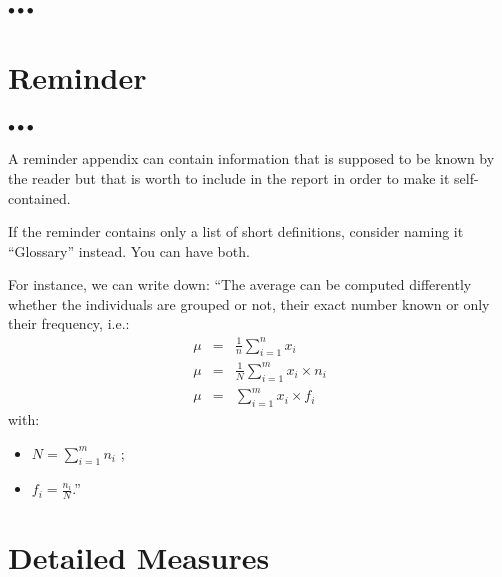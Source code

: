 \documentclass[11pt, english, screen, research-development]{report-rd-info}
\newenvironment{explanation}
{\color{blue}
 \begin{list}{}{\hspace{0.2\textwidth}\color{blue}}\item $\bullet\bullet\bullet$
}
{\end{list}}
\begin{document}
\begin{explanation}
   \bigskip

   \begin{center}
   \end{center}
\end{explanation}

\chapter{Reminder}
\label{app:Reminder}

\begin{explanation}
   A reminder appendix can contain information that is supposed to be known by the reader but that is worth to include in the report in order to make it self-contained.

   If the reminder contains only a list of short definitions, consider naming it ``Glossary'' instead.
    You can have both.

   For instance, we can write down: ``The average can be computed differently whether the individuals are grouped or not, their exact number known or only their frequency, i.e.:
   \begin{eqnarray}
       \mu & = & \frac{1}{n} \sum_{i=1}^n x_i\\
       \mu & = & \frac{1}{N} \sum_{i=1}^m x_i \times n_i\\
       \mu & = & \sum_{i=1}^m x_i \times f_i
   \end{eqnarray}
   with:
   \begin{itemize}
       \item $N = \sum_{i=1}^m n_i$ ;
       \item $f_i = \frac{n_i}{N}$.''
   \end{itemize}
\end{explanation}

\chapter{Detailed Measures}
\label{app:Measures}
\end{document}
